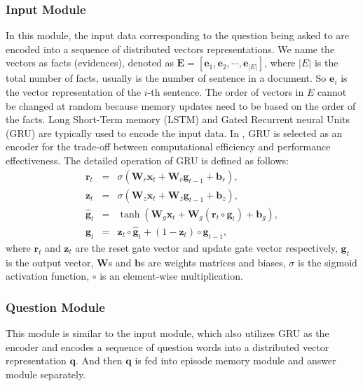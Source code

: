 \documentclass[conference]{IEEEtran}
\begin{document}
	\subsubsection{Input Module}
	In this module, the input data corresponding to the question being asked to are encoded into a sequence of distributed vectors representations. We name the vectors as facts (evidences), denoted as $\mathbf{E}=[\mathbf{e}_1, \mathbf{e}_2, \cdots, \mathbf{e}_{|E|}]$, where $|E|$ is the total number of facts, usually is the number of sentence in a document. So $\mathbf{e}_i$ is the vector representation of the $i$-th sentence. The order of vectors in $E$ cannot be changed at random because memory updates need to be based on the order of the facts. Long Short-Term memory (LSTM) \cite{Hochreiter:1997:LSM:1246443.1246450} and Gated Recurrent neural Units (GRU) \cite{chung2014empirical} are typically used to encode the input data. In \cite{kumar2016ask}, GRU is selected as an encoder for the trade-off between computational efficiency and performance effectiveness. 
	The detailed operation of GRU is defined as follows:
	\begin{eqnarray}
	\mathbf{r}_t &=& \sigma(\mathbf{W}_{r}\mathbf{x}_t + \mathbf{W}_{r}\mathbf{g}_{t-1} + \mathbf{b}_r), \nonumber \\
	\mathbf{z}_t &=& \sigma(\mathbf{W}_{z}\mathbf{x}_t + \mathbf{W}_{z}\mathbf{g}_{t-1} + \mathbf{b}_z), \nonumber \\
	\hat{\mathbf{g}}_t &=& \tanh(\mathbf{W}_{g}\mathbf{x}_t + \mathbf{W}_{g}(\mathbf{r}_t\circ \mathbf{g}_t) + \mathbf{b}_g), \nonumber\\ 
	\mathbf{g}_t &=& \mathbf{z}_t \circ \hat{\mathbf{g}}_t + (1 - \mathbf{z}_t) \circ \mathbf{g}_{t-1},
	\end{eqnarray}
	where $\mathbf{r}_t$ and $\mathbf{z}_t$ are the reset gate vector and update gate vector respectively, $\mathbf{g}_t$ is the output vector, $\mathbf{W}$s and $\mathbf{b}$s are weights matrices and biases, $\sigma$ is the sigmoid activation function, $\circ$ is an element-wise multiplication. 
	\subsubsection{Question Module}
	This module is similar to the input module, which also utilizes GRU as the encoder and encodes a sequence of question words into a distributed vector representation $\mathbf{q}$. And then $\mathbf{q}$ is fed into episode memory module and answer module separately. 
\end{document}
